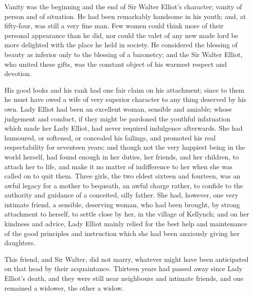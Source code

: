\documentclass[12pt, oneside]{article}   	%
\begin{document}
Vanity was the beginning and the end of Sir Walter Elliot’s character;
vanity of person and of situation. He had been remarkably handsome in
his youth; and, at fifty-four, was still a very fine man. Few women
could think more of their personal appearance than he did, nor could
the valet of any new made lord be more delighted with the place he held
in society. He considered the blessing of beauty as inferior only to
the blessing of a baronetcy; and the Sir Walter Elliot, who united
these gifts, was the constant object of his warmest respect and
devotion.

His good looks and his rank had one fair claim on his attachment; since
to them he must have owed a wife of very superior character to any
thing deserved by his own. Lady Elliot had been an excellent woman,
sensible and amiable; whose judgement and conduct, if they might be
pardoned the youthful infatuation which made her Lady Elliot, had never
required indulgence afterwards. She had humoured, or softened, or
concealed his failings, and promoted his real respectability for
seventeen years; and though not the very happiest being in the world
herself, had found enough in her duties, her friends, and her children,
to attach her to life, and make it no matter of indifference to her
when she was called on to quit them. Three girls, the two eldest
sixteen and fourteen, was an awful legacy for a mother to bequeath, an
awful charge rather, to confide to the authority and guidance of a
conceited, silly father. She had, however, one very intimate friend, a
sensible, deserving woman, who had been brought, by strong attachment
to herself, to settle close by her, in the village of Kellynch; and on
her kindness and advice, Lady Elliot mainly relied for the best help
and maintenance of the good principles and instruction which she had
been anxiously giving her daughters.

This friend, and Sir Walter, did not marry, whatever might have been
anticipated on that head by their acquaintance. Thirteen years had
passed away since Lady Elliot’s death, and they were still near
neighbours and intimate friends, and one remained a widower, the other
a widow.
\end{document}
